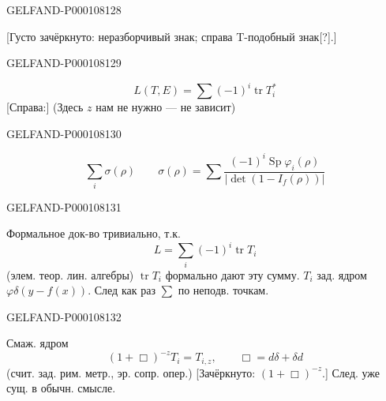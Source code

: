 \begin{GelfandAdjacentEvidence}{GELFAND-P000108}{128}

[Густо зачёркнуто: неразборчивый знак; справа T-подобный знак[?].]
\end{GelfandAdjacentEvidence}
\begin{GelfandAdjacentEvidence}{GELFAND-P000108}{129}

\begin{equation*}L(T,E)=\sum(-1)^i\operatorname{tr}T_i^*\end{equation*}
[Справа:] (Здесь $z$ нам не нужно — не зависит)
\end{GelfandAdjacentEvidence}
\begin{GelfandAdjacentEvidence}{GELFAND-P000108}{130}

\begin{equation*}\sum_i\sigma(\rho)\qquad\sigma(\rho)=\sum\frac{(-1)^i\operatorname{Sp}\varphi_i(\rho)}{|\operatorname{det}(1-I_f(\rho))|}\end{equation*}
\end{GelfandAdjacentEvidence}
\begin{GelfandAdjacentEvidence}{GELFAND-P000108}{131}

Формальное док-во тривиально, т.к.
\begin{equation*}L=\sum_i(-1)^i\operatorname{tr}T_i\end{equation*}
(элем. теор. лин. алгебры)
$\operatorname{tr}T_i$ формально дают эту сумму.
$T_i$ зад. ядром $\varphi\delta(y-f(x))$. След как раз $\sum$ по неподв. точкам.
\end{GelfandAdjacentEvidence}
\begin{GelfandAdjacentEvidence}{GELFAND-P000108}{132}

Смаж. ядром
\begin{equation*}(1+\Box)^{-z}T_i=T_{i,z},\qquad\Box=d\delta+\delta d\end{equation*}
(счит. зад. рим. метр., эр. сопр. опер.)
[Зачёркнуто: $(1+\Box)^{-z}$.]
След. уже сущ. в обычн. смысле.
\end{GelfandAdjacentEvidence}

